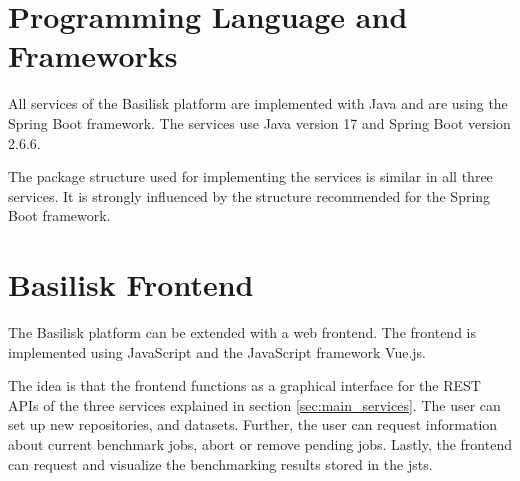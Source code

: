 \section{Programming Language and Frameworks}
\label{sec:prog_lang_and_framework}
All services of the Basilisk platform are implemented with Java and are using the Spring Boot framework.
The services use Java version 17 and Spring Boot version 2.6.6.

The package structure used for implementing the services is similar in all three services.
It is strongly influenced by the structure recommended for the Spring Boot framework.






\section{Basilisk Frontend}
\label{sec:basilisk_frontend}
The Basilisk platform can be extended with a web frontend.
The frontend is implemented using JavaScript and the JavaScript framework Vue.js.

The idea is that the frontend functions as a graphical interface for the REST APIs of the three services explained in section \ref{sec:main_services}.
The user can set up new repositories, \tsp{} and datasets.
Further, the user can request information about current benchmark jobs, abort or remove pending jobs.
Lastly, the frontend can request and visualize the benchmarking results stored in the \acl{jsts}.







